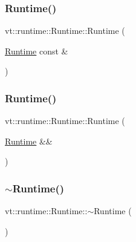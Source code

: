 \subsubsection{\texorpdfstring{Runtime()}{Runtime()}\hspace{0.1cm}{\footnotesize\ttfamily [2/3]}}
{\footnotesize\ttfamily vt\+::runtime\+::\+Runtime\+::\+Runtime (\begin{DoxyParamCaption}\item[{\hyperlink{structvt_1_1runtime_1_1_runtime}{Runtime} const \&}]{ }\end{DoxyParamCaption})\hspace{0.3cm}{\ttfamily [delete]}}

\mbox{\label{structvt_1_1runtime_1_1_runtime_a146708e42fa94f4d50bfdd6159f4d642}} 
\subsubsection{\texorpdfstring{Runtime()}{Runtime()}\hspace{0.1cm}{\footnotesize\ttfamily [3/3]}}
{\footnotesize\ttfamily vt\+::runtime\+::\+Runtime\+::\+Runtime (\begin{DoxyParamCaption}\item[{\hyperlink{structvt_1_1runtime_1_1_runtime}{Runtime} \&\&}]{ }\end{DoxyParamCaption})\hspace{0.3cm}{\ttfamily [delete]}}

\mbox{\label{structvt_1_1runtime_1_1_runtime_ae164ab301b823d985a62b7a5fb62cf07}} 
\subsubsection{\texorpdfstring{$\sim$\+Runtime()}{~Runtime()}}
{\footnotesize\ttfamily vt\+::runtime\+::\+Runtime\+::$\sim$\+Runtime (\begin{DoxyParamCaption}{ }\end{DoxyParamCaption})\hspace{0.3cm}{\ttfamily [virtual]}}



